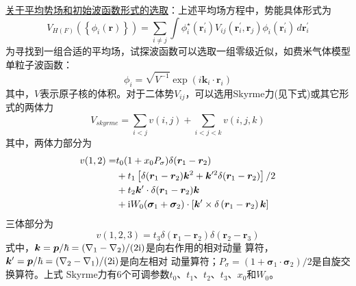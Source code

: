 \uline{关于平均势场和初始波函数形式的选取}：上述平均场方程中，势能具体形式为
\begin{equation}
    V_{H(F)}\left( \left\{ \phi_i(\bm{r}) \right\} \right) = \sum_{i \neq j} \int 
    \phi_i^{\star}(\bm{r}_i^{\prime}) V_{ij}(\bm{r}_i^{\prime}, \bm{r}_j) \phi_{i}(\bm{r}_i^{\prime})
    \,d\bm{r}_i^{\prime}
    \label{eq:mean-field}
\end{equation}
为寻找到一组合适的平均场，试探波函数可以选取一组零级近似，如费米气体模型单粒子波函数：
\begin{equation}
    \phi_i = \sqrt{V^{-1}} \exp{(i \bm{k}_i \cdot \bm{r}_i)}
    \label{eq:fermi-gas-eigen}
\end{equation}
其中，$V$表示原子核的体积。对于二体势$V_{ij}$，可以选用Skyrme力(见下式)或其它形式的两体力
\begin{equation}
    V_{skyrme} = \sum_{i<j} v(i, j) + \sum_{i<j<k} v(i, j, k)
    \label{eq:skyrme-forc}
\end{equation}
其中，两体力部分为
\begin{equation}
    \begin{aligned}
        v(1, 2) =& t_0 (1 + x_0 P_{\sigma})\delta(\bm{r}_1 - \bm{r}_2) \\
            & + t_1\left[ \delta(\bm{r}_1 - \bm{r}_2) \bm{k}^{2}
              + \bm{k}^{\prime 2}\delta(\bm{r}_1 - \bm{r}_2)\right] / 2 \\
            & + t_2\bm{k}^{\prime} \cdot \delta(\bm{r}_1 - \bm{r}_2) \bm{k} \\
            & + {\rm i} W_0(\bm{\sigma}_1 + \bm{\sigma}_2)\cdot \left[ 
            \bm{k}^{\prime} \times \delta\left( \bm{r}_1 - \bm{r}_2 \right) \bm{k}\right]
    \end{aligned}
    \label{eq:skyrme-tow-body-forc}
\end{equation}
三体部分为
\begin{equation}
    v(1, 2, 3) = t_3 \delta(\bm{r}_1 - \bm{r}_2) \delta(\bm{r}_2 - \bm{r}_3)
    \label{eq:skyrm-three-body-forc}
\end{equation}
式中，$\bm{k} = \bm{p}/\hbar = (\nabla_{1} - \nabla_{2}) / (2{\rm i})$是向右作用的相对动量
算符，$\bm{k}^{\prime} = \bm{p}/\hbar = (\nabla_{2} - \nabla_{1}) / (2{\rm i})$是向左相对
动量算符；$P_{\sigma} = (1 + \bm{\sigma}_1 \cdot \bm{\sigma}_2) / 2$是自旋交换算符。上式
Skyrme力有6个可调参数$t_0$、$t_1$、$t_2$、$t_3$、$x_0$和$W_0$。

